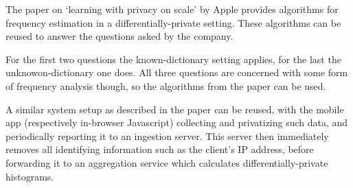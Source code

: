 \documentclass[a4paper]{scrreprt}
\begin{document}
The paper on `learning with privacy on scale' by Apple provides algorithms for
frequency estimation in a differentially-private setting. These algorithms can
be reused to answer the questions asked by the company.

For the first two questions the known-dictionary setting applies, for the last
the unknowon-dictionary one does. All three questions are concerned with some
form of frequency analysis though, so the algorithms from the paper can be used.

A similar system setup as described in the paper can be reused, with the mobile
app (respectively in-browser Javascript) collecting and privatizing such data,
and periodically reporting it to an ingestion server. This server then
immediately removes all identifying information such as the client's IP
address, before forwarding it to an aggregation service which calculates
differentially-private histograms.

\printbibliography
\end{document}
